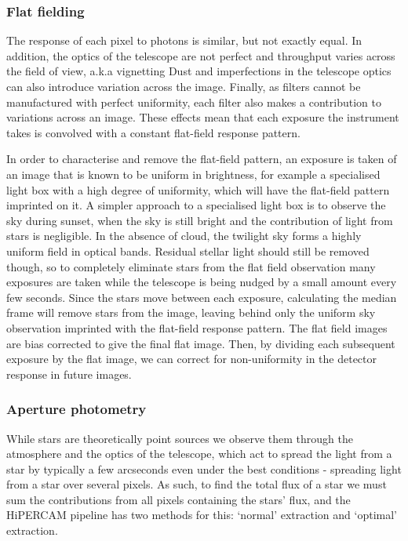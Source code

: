 \subsubsection{Flat fielding}
\label{sect:observations:flat field frames}

The response of each pixel to photons is similar, but not exactly equal. In addition, the optics of the telescope are not perfect and throughput varies across the field of view, a.k.a vignetting Dust and imperfections in the telescope optics can also introduce variation across the image. Finally, as filters cannot be manufactured with perfect uniformity, each filter also makes a contribution to variations across an image.
These effects mean that each exposure the instrument takes is convolved with a constant flat-field response pattern.

In order to characterise and remove the flat-field pattern, an exposure is taken of an image that is known to be uniform in brightness, for example a specialised light box with a high degree of uniformity, which will have the flat-field pattern imprinted on it. 
A simpler approach to a specialised light box is to observe the sky during sunset, when the sky is still bright and the contribution of light from stars is negligible. In the absence of cloud, the twilight sky forms a highly uniform field in optical bands.
Residual stellar light should still be removed though, so to completely eliminate stars from the flat field observation many exposures are taken while the telescope is being nudged by a small amount every few seconds. Since the stars move between each exposure, calculating the median frame will remove stars from the image, leaving behind only the uniform sky observation imprinted with the flat-field response pattern. 
The flat field images are bias corrected to give the final flat image.
Then, by dividing each subsequent exposure by the flat image, we can correct for non-uniformity in the detector response in future images. 


\subsubsection{Aperture photometry}
\label{sect:observations:aperture photometry}

While stars are theoretically point sources we observe them through the atmosphere and the optics of the telescope, which act to spread the light from a star by typically a few arcseconds even under the best conditions - spreading light from a star over several pixels. As such, to find the total flux of a star we must sum the contributions from all pixels containing the stars' flux, and the HiPERCAM pipeline has two methods for this: `normal' extraction and `optimal' extraction.

